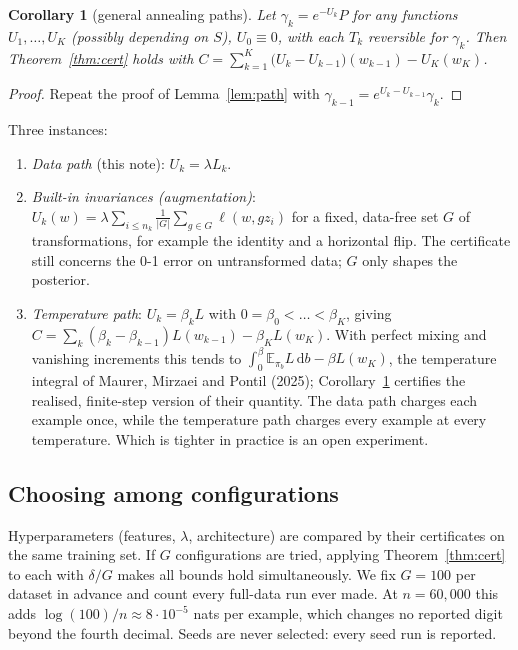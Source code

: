 \documentclass[11pt]{article}
\newtheorem{corollary}[theorem]{Corollary}
\theoremstyle{definition}
\theoremstyle{remark}
\newcommand{\E}{\mathbb{E}}
\newcommand{\dd}{\mathrm{d}}
\begin{document}
\begin{corollary}[general annealing paths]\label{cor:general}
Let $\gamma_k=e^{-U_k}P$ for any functions $U_1,\dots,U_K$ (possibly depending on $S$), $U_0\equiv0$, with each $T_k$
reversible for $\gamma_k$. Then Theorem~\ref{thm:cert} holds with
$C=\sum_{k=1}^K\big(U_k-U_{k-1}\big)(w_{k-1})-U_K(w_K)$.
\end{corollary}
\begin{proof}
Repeat the proof of Lemma~\ref{lem:path} with $\gamma_{k-1}=e^{U_k-U_{k-1}}\gamma_k$.
\end{proof}
Three instances:
\begin{enumerate}[nosep]
\item \emph{Data path} (this note): $U_k=\lambda L_k$.
\item \emph{Built-in invariances (augmentation)}: $U_k(w)=\lambda\sum_{i\le n_k}\frac1{|G|}\sum_{g\in G}\ell(w,gz_i)$ for a fixed,
  data-free set $G$ of transformations, for example the identity and a horizontal flip. The certificate still concerns the
  0-1 error on untransformed data; $G$ only shapes the posterior.
\item \emph{Temperature path}: $U_k=\beta_kL$ with $0=\beta_0<\dots<\beta_K$, giving
  $C=\sum_k(\beta_k-\beta_{k-1})L(w_{k-1})-\beta_KL(w_K)$. With perfect mixing and vanishing increments this tends to
  $\int_0^{\beta}\E_{\pi_b}L\,\dd b-\beta L(w_K)$, the temperature integral of Maurer, Mirzaei and Pontil (2025);
  Corollary~\ref{cor:general} certifies the realised, finite-step version of their quantity. The data path charges each
  example once, while the temperature path charges every example at every temperature. Which is tighter in practice is
  an open experiment.
\end{enumerate}

\subsection{Choosing among configurations}\label{sec:select}
Hyperparameters (features, $\lambda$, architecture) are compared by their certificates on the same training set. If $G$
configurations are tried, applying Theorem~\ref{thm:cert} to each with $\delta/G$ makes all bounds hold simultaneously.
We fix $G=100$ per dataset in advance and count every full-data run ever made. At $n=60{,}000$ this adds
$\log(100)/n\approx8\cdot10^{-5}$ nats per example, which changes no reported digit beyond the fourth decimal. Seeds are
never selected: every seed run is reported.
\end{document}
